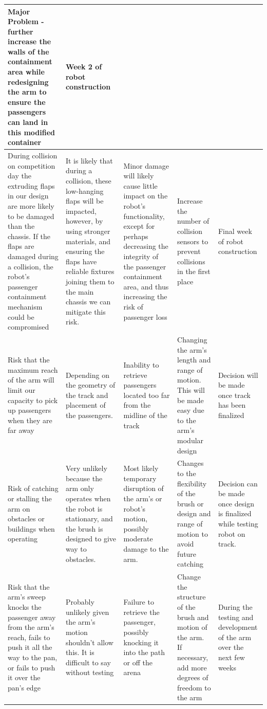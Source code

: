 \documentclass[12pt]{article}
\begin{document}
\begin{longtable}{| L{7em} | L{7em} | L{7em} | L{7em} | L{6em} |}
Major Problem \newline - further increase the walls of the containment area
while redesigning the arm to ensure the passengers can land in this modified
container & Week 2 of robot construction\\
\hline
During collision on competition day the extruding flaps in our design are more
likely to be damaged than the chassis. If the flaps are damaged during a
collision, the robot’s passenger containment mechanism could be compromised & It
is likely that during a collision, these low-hanging flaps will be impacted,
however, by using stronger materials, and ensuring the flaps have reliable
fixtures joining them to the main chassis we can mitigate this risk.& Minor
damage will likely cause little impact on the robot's functionality, except for
perhaps decreasing the integrity of the passenger containment area, and thus
increasing the risk of passenger loss &Increase the number of collision sensors
to prevent collisions in the first place & Final week of robot construction \\
\hline
Risk that the maximum reach of the arm will limit our capacity to pick up
passengers when they are far away & Depending on the geometry of the track and
placement of the passengers.& Inability to retrieve passengers located too far
from the midline of the track & Changing the arm’s length and range of motion.
This will be made easy due to the arm’s modular design & Decision will be made
once track has been finalized\\
\hline 
Risk of catching or stalling the arm on obstacles or buildings when operating&
Very unlikely because the arm only operates when the robot is stationary, and
the brush is designed to give way to obstacles.& Most likely temporary
disruption of the arm’s or robot’s motion, possibly moderate damage to the arm.
&Changes to the flexibility of the brush or design and range of motion to avoid
future catching & Decision can be made once design is finalized while testing
robot on track.\\
\hline
Risk that the arm’s sweep knocks the passenger away from the arm’s reach, fails
to push it all the way to the pan, or fails to push it over the pan’s edge &
Probably unlikely given the arm’s motion shouldn’t allow this. It is difficult
to say without testing&Failure to retrieve the passenger, possibly knocking it
into the path or off the arena& Change the structure of the brush and motion of
the arm. If necessary, add more degrees of freedom to the arm & During the
testing and development of the arm over the next few weeks\\
\hline
\end{longtable}
\end{document}
